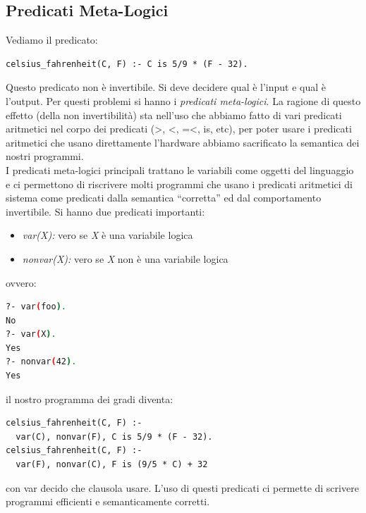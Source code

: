 \documentclass[a4paper,12pt, oneside]{book}
\begin{document}
\subsection{Predicati Meta-Logici}
Vediamo il predicato:
\begin{verbatim}
celsius_fahrenheit(C, F) :- C is 5/9 * (F - 32).
\end{verbatim}
Questo predicato non è invertibile. Si deve decidere qual è l'input e qual è l'output. Per questi problemi si hanno i \textit{predicati meta-logici}. La ragione di questo effetto (della non invertibilità) sta nell'uso che abbiamo fatto di vari predicati aritmetici nel corpo dei predicati (>, <, =<, is, etc), per poter usare i predicati aritmetici che usano direttamente l'hardware abbiamo sacrificato la semantica dei
nostri programmi.\\
I predicati meta-logici principali trattano le variabili come oggetti del linguaggio e ci permettono di riscrivere molti programmi che usano i predicati aritmetici di sistema come predicati dalla semantica “corretta” ed dal comportamento invertibile. Si hanno due predicati importanti:
\begin{itemize}
\item \textit{var(X):}  vero se \textit{X} è una variabile logica
\item \textit{nonvar(X):}  vero se \textit{X} non è una variabile logica
\end{itemize}
ovvero:

\begin{shaded}
\begin{lstlisting}[language=bash]
?- var(foo).
No
?- var(X).
Yes
?- nonvar(42).
Yes
\end{lstlisting}
\end{shaded}

il nostro programma dei gradi diventa:
\begin{verbatim}
celsius_fahrenheit(C, F) :- 
  var(C), nonvar(F), C is 5/9 * (F - 32).
celsius_fahrenheit(C, F) :- 
  var(F), nonvar(C), F is (9/5 * C) + 32
\end{verbatim}
con var decido che clausola usare. L'uso di questi predicati ci permette di scrivere programmi efficienti e semanticamente corretti.
\end{document}
